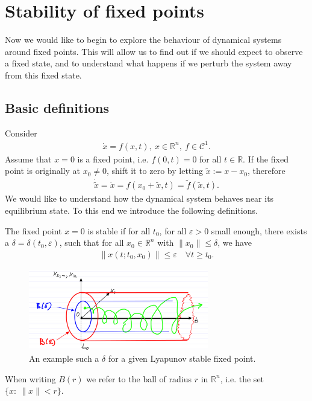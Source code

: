 \chapter{Stability of fixed points}
Now we would like to begin to explore the behaviour of dynamical systems around fixed points. This will allow us to find out if we should expect to observe a fixed state, and to understand what happens if we perturb the system away from this fixed state.
\section{Basic definitions}
Consider
\begin{align}
	\dot{ {x}}=f( {x},t),\  {x} \in \mathbb{R}^{n},\ f\in \mathcal{C}^{1}.
\end{align}
Assume that $ {x}=0$ is a fixed point, i.e. $f({0},t) = {0}$ for all $t \in \mathbb{R}$. If the fixed point is originally at ${x}_0\neq {0}$, shift it to zero by letting $\tilde{ {x}}:= {x}- {x}_0$, therefore 
\begin{align}
	\dot{\tilde{ {x}}} = \dot{ {x}} = f( {x}_0 + \tilde{ {x}}, t) = \tilde{f}(\tilde{ {x}}, t).
\end{align}
We would like to understand how the dynamical system behaves near its equilibrium state. To this end we introduce the following definitions.
\begin{definition} \label{def:stable}
	The fixed point $ {x}={0}$ is stable if for all $t_0$, for all $\varepsilon>0$ small enough, there exists a $\delta=\delta(t_0, \varepsilon)$, such that for all $ {x}_0 \in \mathbb{R}^{n}$ with $\| {x}_0\| \leq \delta$, we have 
	\begin{align}
		\boxed{
			\left \|  {x}(t;t_0,  {x}_0) \right\| \leq \varepsilon \quad \forall t \geq t_0.
		}
	\end{align}
\begin{figure}[h!]
	\centering
	\includegraphics[width=0.7\textwidth]{figures/ch2/1lyapunov_stability.png}
	\caption{An example such a $\delta$ for a given Lyapunov stable fixed point.}
	\label{fig:lyapunov_stability_def}
\end{figure}
\end{definition}
\begin{remark}
	When writing $B(r)$ we refer to the ball of radius $r$ in $\mathbb{R}^{n}$, i.e. the set $\{x:\ \|x\| < r\}$.
\end{remark}

